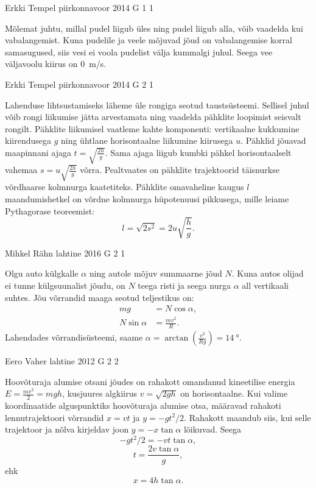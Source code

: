 \documentclass[11pt, twoside]{article}
\begin{document}
{%
{Erkki Tempel} %
{piirkonnavoor} %
{2014} %
{G 1} %
{1} %
{

\ifSolution
Mõlemat juhtu, millal pudel liigub üles ning pudel liigub alla, võib vaadelda kui vabalangemist. Kuna pudelile ja veele mõjuvad  jõud on vabalangemise korral samasugused, siis vesi ei voola pudelist välja kummalgi juhul. Seega vee väljavoolu kiirus on \SI{0}{m/s}.
\fi
}

{Erkki Tempel} %
{piirkonnavoor} %
{2014} %
{G 2} %
{1} %
{

\ifSolution
Lahenduse lihtsustamiseks läheme üle rongiga seotud taustsüsteemi. Sellisel juhul võib rongi liikumise jätta arvestamata ning vaadelda pähklite loopimist seisvalt rongilt. Pähklite liikumisel vaatleme kahte komponenti: vertikaalne kukkumine kiirendusega $g$ ning ühtlane horisontaalne liikumine kiirusega $u$. Pähklid jõuavad maapinnani ajaga 
$t=\sqrt{\frac{2h}{g}}$.
Sama ajaga liigub kumbki pähkel horisontaalselt vahemaa $s=u\sqrt{\frac{2h}{g}}$ võrra. Pealtvaates on pähklite trajektoorid täisnurkse võrdhaarse kolmnurga kaatetiteks. Pähklite omavaheline kaugus $l$ maandumishetkel on võrdne kolmnurga hüpotenuusi pikkusega, mille leiame Pythagorase teoreemist:
\[ l=\sqrt{2s^2}=2u\sqrt{\frac{h}{g}}. \]
\fi
}

{Mihkel Rähn} %
{lahtine} %
{2016} %
{G 2} %
{1} %
{

\ifSolution
Olgu auto külgkalle $\alpha$ ning autole mõjuv summaarne jõud $N$. Kuna autos olijad ei tunne külgsuunalist jõudu, on $N$ teega risti ja seega nurga $\alpha$ all vertikaali suhtes. Jõu võrrandid maaga seotud teljestikus on:
\begin{align*}
mg &= N\cos \alpha,\\
N\sin\alpha &= \frac{mv^2}{R}.
\end{align*}
Lahendades võrrandisüsteemi, saame $\alpha = \arctan(\frac{v^2}{Rg}) = \SI{14}{\degree}$.
\fi
}

{Eero Vaher} %
{lahtine} %
{2012} %
{G 2} %
{2} %
{

\ifSolution
Hoovõturaja alumise otsani jõudes on rahakott omandanud kineetilise energia $E=\frac{mv^2}{2}=mgh$, kusjuures algkiirus $v=\sqrt{2gh}$ on horisontaalne. Kui valime koordinaatide alguspunktiks hoovõturaja alumise otsa, määravad rahakoti lennutrajektoori võrrandid $x=vt$ ja $y=-gt^2 / 2$. Rahakott maandub siis, kui selle trajektoor ja nõlva kirjeldav joon $y=-x\tan\alpha$ lõikuvad. Seega 
$$-gt^2 / 2=-vt\tan\alpha,$$ 
$$t=\frac{2v \tan \alpha}{g},$$ 
ehk
$$x=4h \tan\alpha.$$
\fi
}

}
\end{document}
